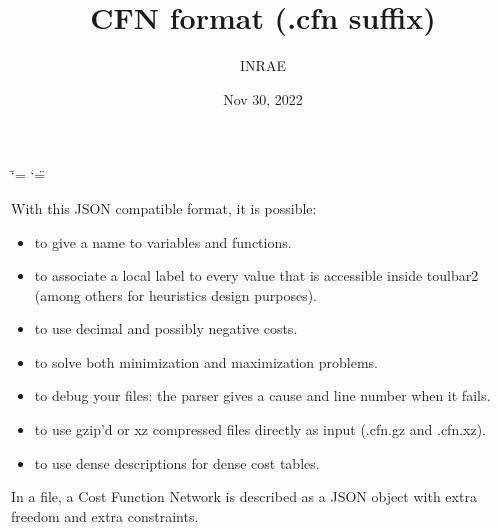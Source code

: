 \documentclass[letterpaper,10pt,openany,oneside,english]{sphinxmanual}
\title{CFN format (.cfn suffix)}
\date{Nov 30, 2022}
\author{INRAE}
\begin{document}
\ifdefined\shorthandoff
  \ifnum\catcode`\=\string=\active\shorthandoff{=}\fi
  \ifnum\catcode`\"=\active{}\fi
\fi

\pagestyle{empty}
\sphinxmaketitle
\pagestyle{plain}
\sphinxtableofcontents
\pagestyle{normal}
\label{\detokenize{formats/cfnformat::doc}}


\sphinxAtStartPar
With this JSON compatible format, it is possible:
\begin{itemize}
\item {} 
\sphinxAtStartPar
to give a name to variables and functions.

\item {} 
\sphinxAtStartPar
to associate a local label to every value that is accessible inside toulbar2 (among others for heuristics design purposes).

\item {} 
\sphinxAtStartPar
to use decimal and possibly negative costs.

\item {} 
\sphinxAtStartPar
to solve both minimization and maximization problems.

\item {} 
\sphinxAtStartPar
to debug your  files: the parser gives a cause and line number when it fails.

\item {} 
\sphinxAtStartPar
to use gzip’d or xz compressed files directly as input (.cfn.gz and .cfn.xz).

\item {} 
\sphinxAtStartPar
to use dense descriptions for dense cost tables.

\end{itemize}

\sphinxAtStartPar
In a  file, a Cost Function Network is described as a JSON object with extra freedom and extra constraints.
\end{document}
